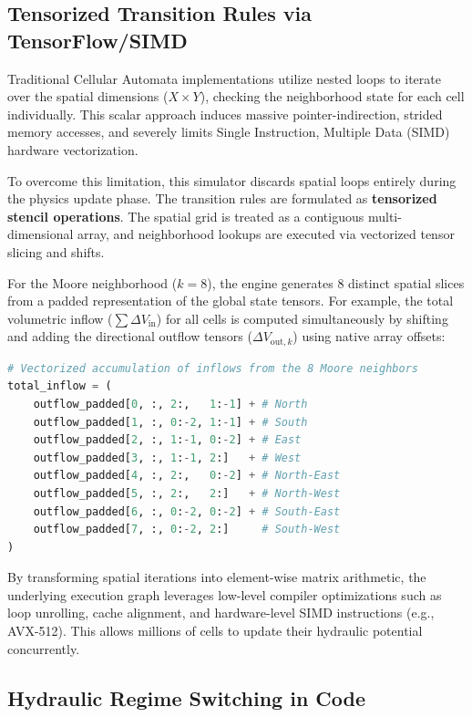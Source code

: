 \subsection{Tensorized Transition Rules via TensorFlow/SIMD}

Traditional Cellular Automata implementations utilize nested loops to iterate over the spatial dimensions ($X \times Y$), checking the 
neighborhood state for each cell individually. This scalar approach induces massive pointer-indirection, strided memory accesses, and 
severely limits Single Instruction, Multiple Data (SIMD) hardware vectorization. 

To overcome this limitation, this simulator discards spatial loops entirely during the physics update phase. The transition rules are 
formulated as \textbf{tensorized stencil operations}. The spatial grid is treated as a contiguous multi-dimensional array, and neighborhood 
lookups are executed via vectorized tensor slicing and shifts. 

For the Moore neighborhood ($k=8$), the engine generates 8 distinct spatial slices from a padded representation of the global state tensors. 
For example, the total volumetric inflow ($\sum \Delta V_{\text{in}}$) for all cells is computed simultaneously by shifting and adding the 
directional outflow tensors ($\Delta V_{\text{out}, k}$) using native array offsets:

\begin{lstlisting}[language=Python, caption=Tensorized Stencil for Inflow Accumulation]
# Vectorized accumulation of inflows from the 8 Moore neighbors
total_inflow = (
    outflow_padded[0, :, 2:,   1:-1] + # North
    outflow_padded[1, :, 0:-2, 1:-1] + # South
    outflow_padded[2, :, 1:-1, 0:-2] + # East
    outflow_padded[3, :, 1:-1, 2:]   + # West
    outflow_padded[4, :, 2:,   0:-2] + # North-East
    outflow_padded[5, :, 2:,   2:]   + # North-West
    outflow_padded[6, :, 0:-2, 0:-2] + # South-East
    outflow_padded[7, :, 0:-2, 2:]     # South-West
)
\end{lstlisting}

By transforming spatial iterations into element-wise matrix arithmetic, the underlying execution graph leverages low-level compiler 
optimizations such as loop unrolling, cache alignment, and hardware-level SIMD instructions (e.g., AVX-512). This allows millions of cells 
to update their hydraulic potential concurrently.

\subsection{Hydraulic Regime Switching in Code}

